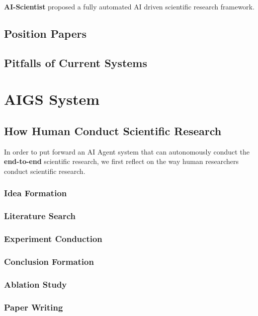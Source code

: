 \documentclass{article} %
\begin{document}
\textbf{AI-Scientist}\citep{lu2024aiscientist} proposed a fully automated AI driven scientific research framework.

\subsection{Position Papers}

\subsection{Pitfalls of Current Systems}


\section{AIGS System}

\subsection{How Human Conduct Scientific Research}

In order to put forward an AI Agent system that can autonomously  conduct the \textbf{end-to-end} scientific research, we first reflect on the way human researchers conduct scientific research.

\subsubsection{Idea Formation}

\subsubsection{Literature Search}

\subsubsection{Experiment Conduction}

\subsubsection{Conclusion Formation}

\subsubsection{Ablation Study}

\subsubsection{Paper Writing}
\end{document}
